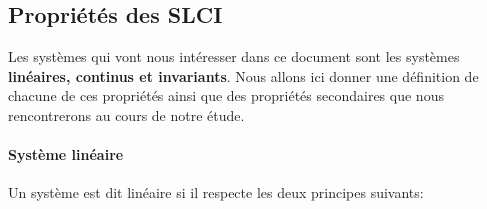 \subsection{Propriétés des SLCI}
Les systèmes qui vont nous intéresser dans ce document sont les systèmes
\textbf{linéaires, continus et invariants}. Nous allons ici donner une 
définition de chacune de ces propriétés ainsi que des propriétés secondaires 
que nous rencontrerons au cours de notre étude.
\paragraph{Système linéaire}
Un système est dit linéaire si il respecte les deux principes suivants:
